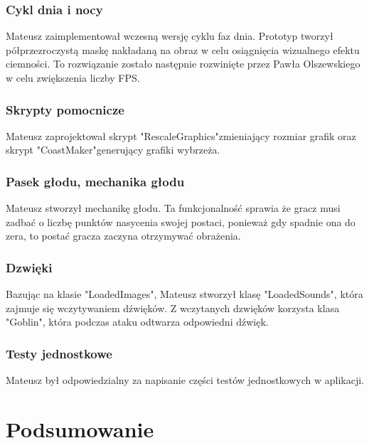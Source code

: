 \documentclass{article}
\begin{document}
\subsubsection{Cykl dnia i nocy}
Mateusz zaimplementował wczesną wersję cyklu faz dnia. Prototyp tworzył półprzezroczystą maskę nakładaną na obraz w celu osiągnięcia wizualnego efektu ciemności. To rozwiązanie zostało następnie rozwinięte przez Pawła Olszewskiego w celu zwiększenia liczby FPS.

\subsubsection{Skrypty pomocnicze}
Mateusz zaprojektował skrypt "RescaleGraphics"\space zmieniający rozmiar grafik oraz skrypt "CoastMaker"\space generujący grafiki wybrzeża.

\subsubsection{Pasek głodu, mechanika głodu}
Mateusz stworzył mechanikę głodu. Ta funkcjonalność sprawia że gracz musi zadbać o liczbę punktów nasycenia swojej postaci, ponieważ gdy spadnie ona do zera, to postać gracza zaczyna otrzymywać obrażenia.

\subsubsection{Dzwięki}
Bazując na klasie "LoadedImages", Mateusz stworzył klasę "LoadedSounds", która zajmuje się wczytywaniem dźwięków. Z wczytanych dzwięków korzysta klasa "Goblin", która podczas ataku odtwarza odpowiedni dźwięk.

\subsubsection{Testy jednostkowe}
Mateusz był odpowiedzialny za napisanie części testów jednostkowych w aplikacji.

\section{Podsumowanie}
\end{document}
